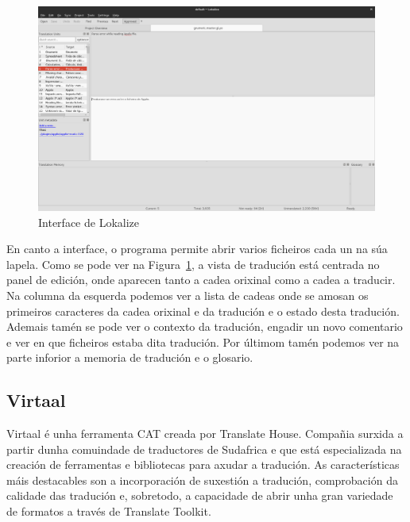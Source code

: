 \begin{figure}[h]
    \centering
    \includegraphics[width=\textwidth]{img/captura_lokalize.png}
    \caption{Interface de Lokalize}
    \label{fig:lokalize}
\end{figure}

En canto a interface, o programa permite abrir varios ficheiros cada un na súa lapela. Como se pode ver na Figura~\ref{fig:lokalize}, a vista de tradución está centrada no panel de edición, onde aparecen tanto a cadea orixinal como a cadea a traducir. Na columna da esquerda podemos ver a lista de cadeas onde se amosan os primeiros caracteres da cadea orixinal e da tradución e o estado desta tradución. Ademais tamén se pode ver o contexto da tradución, engadir un novo comentario e ver en que ficheiros estaba dita tradución. Por últimom tamén podemos ver na parte inforior a memoria de tradución e o glosario.

\subsection{Virtaal}

Virtaal é unha ferramenta CAT creada por Translate House. Compañia surxida a partir dunha comuindade de traductores de Sudafrica e que está especializada na creación de ferramentas e bibliotecas para axudar a tradución. As características máis destacables son a incorporación de suxestión a tradución, comprobación da calidade das tradución e, sobretodo, a capacidade de abrir unha gran variedade de formatos a través de Translate Toolkit.

